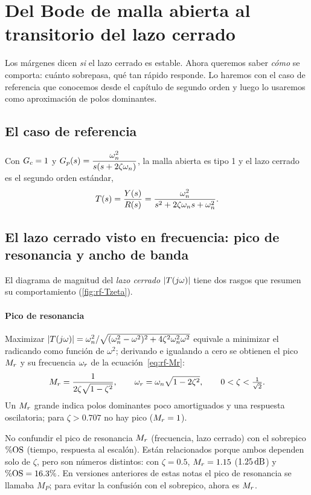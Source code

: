 \section{Del Bode de malla abierta al transitorio del lazo cerrado}
\label{sec:rf-lazocerrado}

Los márgenes dicen \emph{si} el lazo cerrado es estable. Ahora queremos saber \emph{cómo} se comporta: cuánto sobrepasa, qué tan rápido responde. Lo haremos con el caso de referencia que conocemos desde el capítulo de segundo orden y luego lo usaremos como aproximación de polos dominantes.

\subsection{El caso de referencia}
Con $G_c=1$ y $G_p(s)=\dfrac{\omega_n^2}{s(s+2\zeta\omega_n)}$, la malla abierta es tipo 1 y el lazo cerrado es el segundo orden estándar,
\begin{equation}
  T(s)=\frac{Y(s)}{R(s)}=\frac{\omega_n^2}{s^2+2\zeta\omega_n s+\omega_n^2}.
  \label{eq:rf-T2}
\end{equation}

\subsection{El lazo cerrado visto en frecuencia: pico de resonancia y ancho de banda}

El diagrama de magnitud del \emph{lazo cerrado} $|T(j\omega)|$ tiene dos rasgos que resumen su comportamiento (\cref{fig:rf-Tzeta}).

\paragraph{Pico de resonancia}
Maximizar $|T(j\omega)|=\omega_n^2/\sqrt{(\omega_n^2-\omega^2)^2+4\zeta^2\omega_n^2\omega^2}$ equivale a minimizar el radicando como función de $\omega^2$; derivando e igualando a cero se obtienen el pico $M_r$ y su frecuencia $\omega_r$ de la ecuación~\eqref{eq:rf-Mr}:
\[
  M_r=\frac{1}{2\zeta\sqrt{1-\zeta^2}},\qquad \omega_r=\omega_n\sqrt{1-2\zeta^2},\qquad 0<\zeta<\tfrac{1}{\sqrt2}.
\]
Un $M_r$ grande indica polos dominantes poco amortiguados y una respuesta oscilatoria; para $\zeta>0.707$ no hay pico ($M_r=1$).

\begin{cuidado}
No confundir el pico de resonancia $M_r$ (frecuencia, lazo cerrado) con el sobrepico $\%\mathrm{OS}$ (tiempo, respuesta al escalón). Están relacionados porque ambos dependen solo de $\zeta$, pero son números distintos: con $\zeta=0.5$, $M_r=1.15$ ($1.25\,\mathrm{dB}$) y $\%\mathrm{OS}=16.3\%$. En versiones anteriores de estas notas el pico de resonancia se llamaba $M_P$; para evitar la confusión con el sobrepico, ahora es $M_r$.
\end{cuidado}


